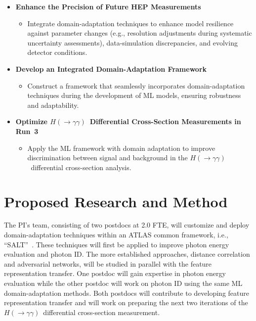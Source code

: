 \documentclass[letter, USenglish, 11pt, subfigure]{article}
\newcommand{\hyy}{\ensuremath{H(\to\gamma\gamma)}}
\begin{document}
\begin{itemize}
  \item \textbf{Enhance the Precision of Future HEP Measurements}
  \begin{itemize}
    \item Integrate domain-adaptation techniques to enhance model resilience against parameter changes (e.g., resolution adjustments during systematic uncertainty assessments), data-simulation discrepancies, and evolving detector conditions.
  \end{itemize}
  
  \item \textbf{Develop an Integrated Domain-Adaptation Framework}
  \begin{itemize}
    \item Construct a framework that seamlessly incorporates domain-adaptation techniques during the development of ML models, ensuring robustness and adaptability.
  \end{itemize}
  
  \item \textbf{Optimize \hyy\ Differential Cross-Section Measurements in Run~3}
  \begin{itemize}
    \item Apply the ML framework with domain adaptation to improve discrimination between signal and background in the \hyy\ differential cross-section analysis.
  \end{itemize}
\end{itemize}
\clearpage
\section{Proposed Research and Method}

The PI's team, consisting of two postdocs at 2.0 FTE, will customize and deploy domain-adaptation techniques within an ATLAS common framework, i.e., ``SALT''~\cite{salt}. These techniques will first be applied to improve photon energy evaluation and photon ID. The more established approaches, distance correlation and adversarial networks, will be studied in parallel with the feature representation transfer. One postdoc will gain expertise in photon energy evaluation while the other postdoc will work on photon ID using the same ML domain-adaptation methods. Both postdocs will contribute to developing feature representation transfer and will work on preparing the next two iterations of the \hyy\ differential cross-section measurement.
\end{document}
